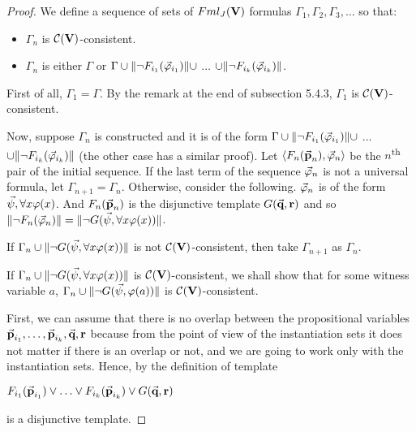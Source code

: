 \begin{proof}
	We define a sequence of sets of $Fml_{J}(\textbf{V})$ formulas $\Gamma_{1}, \Gamma_{2}, \Gamma_{3}, \dots $ so that:
	
	\begin{itemize}
		\item $\Gamma_{n}$ is $\mathcal{C}(\textbf{V})$-consistent.
		\item $\Gamma_{n}$ is either $\Gamma$ or $\Gamma \cup \Arrowvert \neg F_{i_{1}}( \vec{\varphi}_{i_{1}}) \Arrowvert \cup$ $\dots$ $\cup\Arrowvert \neg F_{i_{k}}( \vec{\varphi}_{i_{k}}) \Arrowvert $.    
	\end{itemize}    
	
	\qquad First of all, $\Gamma_{1} =\Gamma$. By the remark at the end of subsection 5.4.3, $\Gamma_{1}$ is $\mathcal{C}(\textbf{V})$-consistent.  
	
	\qquad Now, suppose $\Gamma_{n}$ is constructed and it is of the form
	$\Gamma \cup \Arrowvert \neg F_{i_{1}}( \vec{\varphi}_{i_{1}}) \Arrowvert \cup$ $\dots$ $\cup\Arrowvert \neg F_{i_{k}}( \vec{\varphi}_{i_{k}}) \Arrowvert $ (the other case has a similar proof). Let $\langle F_{n}(\vec{\textbf{p}}_{n}), \vec{\varphi}_{n} \rangle$ be the $n$\textsuperscript{th} pair of the initial sequence. If the last term of the sequence $\vec{\varphi}_{n}$ is not a universal formula, let $\Gamma_{n+1} = \Gamma_{n}$. Otherwise, consider the following. $\vec{\varphi}_{n}$ is of the form $\vec{\psi}, \forall x \varphi (x)$. And $F_{n}(\vec{\textbf{p}}_{n})$ is the disjunctive template $G(\vec{\textbf{q}},\textbf{r})$ and so  $\Arrowvert\neg  F_{n}( \vec{\varphi}_{n}) \Arrowvert = \Arrowvert \neg G(\vec{\psi}, \forall x \varphi (x)) \Arrowvert$.
	
	\qquad If $\Gamma_{n}\cup \Arrowvert \neg G(\vec{\psi}, \forall x \varphi (x)) \Arrowvert$ is not $\mathcal{C}(\textbf{V})$-consistent, then take $\Gamma_{n+1}$ as $\Gamma_{n}$.
	
	\qquad If $\Gamma_{n}\cup \Arrowvert \neg G(\vec{\psi}, \forall x \varphi (x)) \Arrowvert$ is $\mathcal{C}(\textbf{V})$-consistent, we shall show that for some witness variable $a$, $\Gamma_{n}\cup \Arrowvert \neg G(\vec{\psi}, \varphi (a)) \Arrowvert$ is $\mathcal{C}(\textbf{V})$-consistent.
	
	\qquad First, we can assume that there is no overlap between the propositional variables $\vec{\textbf{p}}_{i_{1}}, \dots,\vec{\textbf{p}}_{i_{k}},\vec{\textbf{q}},\textbf{r}$ because from the point of view of the instantiation sets it does not matter if there is an overlap or not, and we are going to work only with the instantiation sets. Hence, by the definition of template
	
	
	\begin{center}
		$F_{i_{1}}(\tvp_{i_{1}})\ou \dots \ou F_{i_{k}}(\tvp_{i_{k}}) \ou G(\vec{\tq},\tr)$
	\end{center}
is a disjunctive template.
	

\end{proof}
